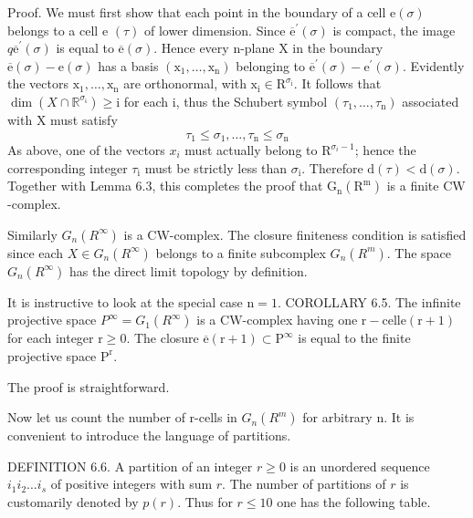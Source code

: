 \documentclass[10pt]{article}
\begin{document}
Proof. We must first show that each point in the boundary of a cell $\mathrm{e}(\sigma)$ belongs to a cell e $(\tau)$ of lower dimension. Since $\overline{\mathrm{e}}^{\prime}(\sigma)$ is compact, the image $q \overline{\mathrm{e}}^{\prime}(\sigma)$ is equal to $\overline{\mathrm{e}}(\sigma)$. Hence every $\mathrm{n}$-plane $\mathrm{X}$ in the boundary $\overline{\mathrm{e}}(\sigma)-\mathrm{e}(\sigma)$ has a basis $\left(\mathrm{x}_{1}, \ldots, \mathrm{x}_{\mathrm{n}}\right)$ belonging to $\overline{\mathrm{e}}^{\prime}(\sigma)-\mathrm{e}^{\prime}(\sigma)$. Evidently the vectors $\mathrm{x}_{1}, \ldots, \mathrm{x}_{\mathrm{n}}$ are orthonormal, with $\mathrm{x}_{\mathrm{i}} \in \mathrm{R}^{\sigma_{\mathrm{i}}}$. It follows that $\operatorname{dim}\left(X \cap \mathbb{R}^{\sigma_{\mathfrak{i}}}\right) \geq \mathrm{i}$ for each $\mathrm{i}$, thus the Schubert symbol $\left(\tau_{1}, \ldots, \tau_{\mathrm{n}}\right)$ associated with $\mathrm{X}$ must satisfy
$$
\tau_{1} \leq \sigma_{1}, \ldots, \tau_{\mathrm{n}} \leq \sigma_{\mathrm{n}}
$$
As above, one of the vectors $x_{i}$ must actually belong to $\mathrm{R}^{\sigma_{i}-1}$; hence the corresponding integer $\tau_{\mathrm{i}}$ must be strictly less than $\sigma_{\mathrm{i}}$. Therefore $\mathrm{d}(\tau)<\mathrm{d}(\sigma)$. Together with Lemma 6.3, this completes the proof that $\mathrm{G}_{\mathrm{n}}\left(\mathrm{R}^{\mathrm{m}}\right)$ is a finite $\mathrm{CW}$-complex.

Similarly $G_{n}\left(R^{\infty}\right)$ is a CW-complex. The closure finiteness condition is satisfied since each $X \in G_{n}\left(R^{\infty}\right)$ belongs to a finite subcomplex $G_{n}\left(R^{m}\right)$. The space $G_{n}\left(R^{\infty}\right)$ has the direct limit topology by definition.

It is instructive to look at the special case $\mathrm{n}=1$. COROLLARY 6.5. The infinite projective space $P^{\infty}=G_{1}\left(R^{\infty}\right)$ is a $\mathrm{CW}$-complex having one $\mathrm{r}-\mathrm{cell} \mathrm{e}(\mathrm{r}+1)$ for each integer $\mathrm{r} \geq 0$. The closure $\overline{\mathrm{e}}(\mathrm{r}+1) \subset \mathrm{P}^{\infty}$ is equal to the finite projective space $\mathrm{P}^{\mathrm{r}}$.

The proof is straightforward.

Now let us count the number of r-cells in $G_{n}\left(R^{m}\right)$ for arbitrary n. It is convenient to introduce the language of partitions.

DEFINITION 6.6. A partition of an integer $r \geq 0$ is an unordered sequence $i_{1} i_{2} \ldots i_{s}$ of positive integers with sum $r$. The number of partitions of $r$ is customarily denoted by $p(r)$. Thus for $r \leq 10$ one has the following table.
\end{document}
